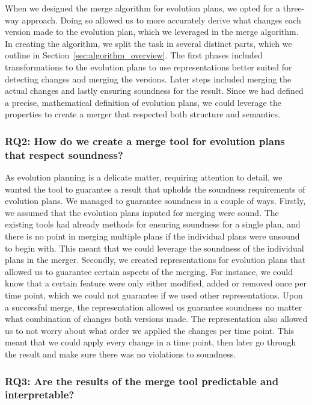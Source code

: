\documentclass[a4paper,english]{ifimaster}
\begin{document}
When we designed the merge algorithm for evolution plans, we opted for a three-way approach. Doing so allowed us to more accurately derive what changes each version made to the evolution plan, which we leveraged in the merge algorithm. In creating the algorithm, we split the task in several distinct parts, which we outline in Section~\vref{sec:algorithm_overview}. The first phases included transformations to the evolution plans to use representations better suited for detecting changes and merging the versions. Later steps included merging the actual changes and lastly ensuring soundness for the result. Since we had defined a precise, mathematical definition of evolution plans, we could leverage the properties to create a merger that respected both structure and semantics.

\subsubsection{RQ2: How do we create a merge tool for evolution plans that respect soundness?}

As evolution planning is a delicate matter, requiring attention to detail, we wanted the tool to guarantee a result that upholds the soundness requirements of evolution plans. We managed to guarantee soundness in a couple of ways. Firstly, we assumed that the evolution plans inputed for merging were sound. The existing tools had already methods for ensuring soundness for a single plan, and there is no point in merging multiple plans if the individual plans were unsound to begin with. This meant that we could leverage the soundness of the individual plans in the merger. Secondly, we created representations for evolution plans that allowed us to guarantee certain aspects of the merging. For instance, we could know that a certain feature were only either modified, added or removed once per time point, which we could not guarantee if we used other representations. Upon a successful merge, the representation allowed us guarantee soundness no matter what combination of changes both versions made. The representation also allowed us to not worry about what order we applied the changes per time point. This meant that we could apply every change in a time point, then later go through the result and make sure there was no violations to soundness.

\subsubsection{RQ3: Are the results of the merge tool predictable and interpretable?}
\end{document}
